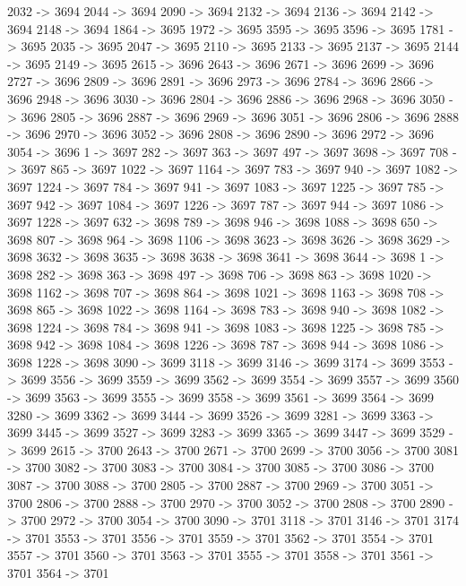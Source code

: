 {	2032 -> 3694
	2044 -> 3694
	2090 -> 3694
	2132 -> 3694
	2136 -> 3694
	2142 -> 3694
	2148 -> 3694
	1864 -> 3695
	1972 -> 3695
	3595 -> 3695
	3596 -> 3695
	1781 -> 3695
	2035 -> 3695
	2047 -> 3695
	2110 -> 3695
	2133 -> 3695
	2137 -> 3695
	2144 -> 3695
	2149 -> 3695
	2615 -> 3696
	2643 -> 3696
	2671 -> 3696
	2699 -> 3696
	2727 -> 3696
	2809 -> 3696
	2891 -> 3696
	2973 -> 3696
	2784 -> 3696
	2866 -> 3696
	2948 -> 3696
	3030 -> 3696
	2804 -> 3696
	2886 -> 3696
	2968 -> 3696
	3050 -> 3696
	2805 -> 3696
	2887 -> 3696
	2969 -> 3696
	3051 -> 3696
	2806 -> 3696
	2888 -> 3696
	2970 -> 3696
	3052 -> 3696
	2808 -> 3696
	2890 -> 3696
	2972 -> 3696
	3054 -> 3696
	1 -> 3697
	282 -> 3697
	363 -> 3697
	497 -> 3697
	3698 -> 3697
	708 -> 3697
	865 -> 3697
	1022 -> 3697
	1164 -> 3697
	783 -> 3697
	940 -> 3697
	1082 -> 3697
	1224 -> 3697
	784 -> 3697
	941 -> 3697
	1083 -> 3697
	1225 -> 3697
	785 -> 3697
	942 -> 3697
	1084 -> 3697
	1226 -> 3697
	787 -> 3697
	944 -> 3697
	1086 -> 3697
	1228 -> 3697
	632 -> 3698
	789 -> 3698
	946 -> 3698
	1088 -> 3698
	650 -> 3698
	807 -> 3698
	964 -> 3698
	1106 -> 3698
	3623 -> 3698
	3626 -> 3698
	3629 -> 3698
	3632 -> 3698
	3635 -> 3698
	3638 -> 3698
	3641 -> 3698
	3644 -> 3698
	1 -> 3698
	282 -> 3698
	363 -> 3698
	497 -> 3698
	706 -> 3698
	863 -> 3698
	1020 -> 3698
	1162 -> 3698
	707 -> 3698
	864 -> 3698
	1021 -> 3698
	1163 -> 3698
	708 -> 3698
	865 -> 3698
	1022 -> 3698
	1164 -> 3698
	783 -> 3698
	940 -> 3698
	1082 -> 3698
	1224 -> 3698
	784 -> 3698
	941 -> 3698
	1083 -> 3698
	1225 -> 3698
	785 -> 3698
	942 -> 3698
	1084 -> 3698
	1226 -> 3698
	787 -> 3698
	944 -> 3698
	1086 -> 3698
	1228 -> 3698
	3090 -> 3699
	3118 -> 3699
	3146 -> 3699
	3174 -> 3699
	3553 -> 3699
	3556 -> 3699
	3559 -> 3699
	3562 -> 3699
	3554 -> 3699
	3557 -> 3699
	3560 -> 3699
	3563 -> 3699
	3555 -> 3699
	3558 -> 3699
	3561 -> 3699
	3564 -> 3699
	3280 -> 3699
	3362 -> 3699
	3444 -> 3699
	3526 -> 3699
	3281 -> 3699
	3363 -> 3699
	3445 -> 3699
	3527 -> 3699
	3283 -> 3699
	3365 -> 3699
	3447 -> 3699
	3529 -> 3699
	2615 -> 3700
	2643 -> 3700
	2671 -> 3700
	2699 -> 3700
	3056 -> 3700
	3081 -> 3700
	3082 -> 3700
	3083 -> 3700
	3084 -> 3700
	3085 -> 3700
	3086 -> 3700
	3087 -> 3700
	3088 -> 3700
	2805 -> 3700
	2887 -> 3700
	2969 -> 3700
	3051 -> 3700
	2806 -> 3700
	2888 -> 3700
	2970 -> 3700
	3052 -> 3700
	2808 -> 3700
	2890 -> 3700
	2972 -> 3700
	3054 -> 3700
	3090 -> 3701
	3118 -> 3701
	3146 -> 3701
	3174 -> 3701
	3553 -> 3701
	3556 -> 3701
	3559 -> 3701
	3562 -> 3701
	3554 -> 3701
	3557 -> 3701
	3560 -> 3701
	3563 -> 3701
	3555 -> 3701
	3558 -> 3701
	3561 -> 3701
	3564 -> 3701
}
